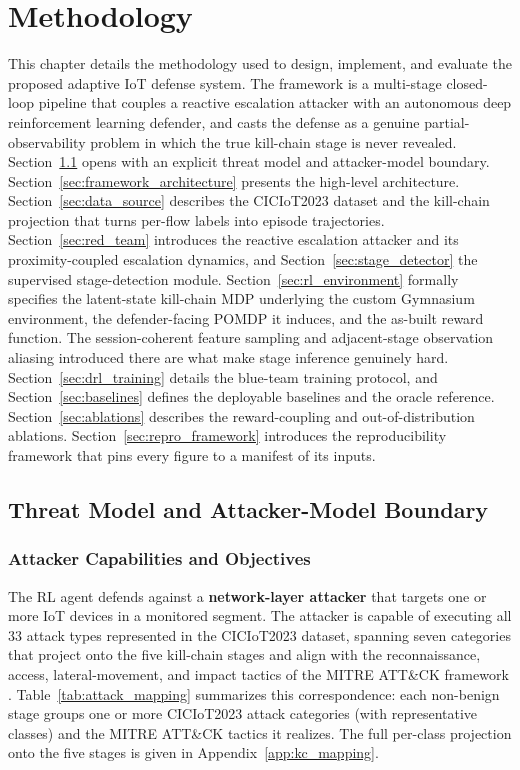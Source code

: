 \chapter{Methodology}\label{cap:methodology}

This chapter details the methodology used to design, implement, and evaluate the proposed adaptive IoT defense system. The framework is a multi-stage closed-loop pipeline that couples a reactive escalation attacker with an autonomous deep reinforcement learning defender, and casts the defense as a genuine partial-observability problem in which the true kill-chain stage is never revealed. Section~\ref{sec:threat_model} opens with an explicit threat model and attacker-model boundary. Section~\ref{sec:framework_architecture} presents the high-level architecture. Section~\ref{sec:data_source} describes the CICIoT2023 dataset and the kill-chain projection that turns per-flow labels into episode trajectories. Section~\ref{sec:red_team} introduces the reactive escalation attacker and its proximity-coupled escalation dynamics, and Section~\ref{sec:stage_detector} the supervised stage-detection module. Section~\ref{sec:rl_environment} formally specifies the latent-state kill-chain MDP underlying the custom Gymnasium environment, the defender-facing POMDP it induces, and the as-built reward function. The session-coherent feature sampling and adjacent-stage observation aliasing introduced there are what make stage inference genuinely hard. Section~\ref{sec:drl_training} details the blue-team training protocol, and Section~\ref{sec:baselines} defines the deployable baselines and the oracle reference. Section~\ref{sec:ablations} describes the reward-coupling and out-of-distribution ablations. Section~\ref{sec:repro_framework} introduces the reproducibility framework that pins every figure to a manifest of its inputs.

\section{Threat Model and Attacker-Model Boundary}\label{sec:threat_model}

\subsection{Attacker Capabilities and Objectives}
The RL agent defends against a \textbf{network-layer attacker} that targets one or more IoT devices in a monitored segment. The attacker is capable of executing all 33 attack types represented in the CICIoT2023 dataset, spanning seven categories that project onto the five kill-chain stages and align with the reconnaissance, access, lateral-movement, and impact tactics of the MITRE ATT\&CK framework \cite{Naik2022}. Table~\ref{tab:attack_mapping} summarizes this correspondence: each non-benign stage groups one or more CICIoT2023 attack categories (with representative classes) and the MITRE ATT\&CK tactics it realizes. The full per-class projection onto the five stages is given in Appendix~\ref{app:kc_mapping}.

